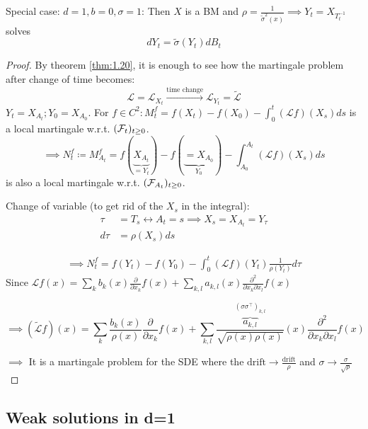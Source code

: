 \begin{remark}
    Special case: $d=1,b=0,\sigma=1$: Then $X$ is a BM and $\rho=\frac{1}{\tilde{\sigma}^2(x)}\implies Y_t=X_{T_t^{-1}}$ solves 
    \[dY_t=\tilde{\sigma}(Y_t)dB_t\]
\end{remark}

\begin{proof}
    By theorem \ref{thm:1.20}, it is enough to see how the martingale problem after 
    change of time becomes: 
    \[\mathcal{L}=\mathcal{L}_{X_t}\stackrel{\text{time change}}{\longrightarrow}\mathcal{L}_{Y_t}=\tilde{\mathcal{L}}\]
    $Y_t=X_{A_t};Y_0=X_{A_0}$. For $f\in C^2: M_t^f=f(X_t)-f(X_0)-\int_0^t (\mathcal{L}f)(X_s)ds$ is a local martingale w.r.t. $(\mathcal{F}_t)_{t\geq 0}$.
    \[\implies N_t^f\coloneqq M_{A_t}^f=f(\underbrace{X_{A_t}}_{=Y_t})-f(\underbrace{=X_{A_0}}_{Y_0})-\int_{A_0}^{A_t}(\mathcal{L}f)(X_s)ds\]
    is also a local martingale w.r.t. $(\mathcal{F}_{A_t})_{t\geq 0}$.

    Change of variable (to get rid of the $X_s$ in the integral):
    \begin{align*}
        \tau&=T_s\leftrightarrow A_t=s \implies X_s=X_{A_t}=Y_\tau \\
        d\tau&=\rho(X_s)ds
    \end{align*}

    \begin{align*}
        \implies N_t^f=f(Y_t)-f(Y_0)-\int_0^t(\mathcal{L}f)(Y_t)\frac{1}{\rho(Y_t)}d\tau
    \end{align*} 
    Since $\mathcal{L}f(x)=\sum_{k}b_k(x)\frac{\partial}{\partial x_k}f(x)+\sum_{k,l}a_{k,l}(x)\frac{\partial^2}{\partial x_k\partial x_l} f(x)$

    \[\implies (\tilde{\mathcal{L}}f)(x)=\sum_{k}\frac{b_k(x)}{\rho(x)}\frac{\partial}{\partial x_k}f(x)+\sum_{k,l}\frac{\overbrace{a_{k,l}}^{(\sigma\sigma^\intercal)_{k,l}}}{\sqrt{{\rho(x)}{\rho(x)}}}(x)\frac{\partial^2}{\partial x_k\partial x_l} f(x)\]

    $\implies$ It is a martingale problem for the SDE 
    where the $\text{drift}\to\frac{\text{drift}}{\rho}$ and $\sigma\to \frac{\sigma}{\sqrt{\rho}}$

\end{proof}

\subsection{Weak solutions in d=1}

